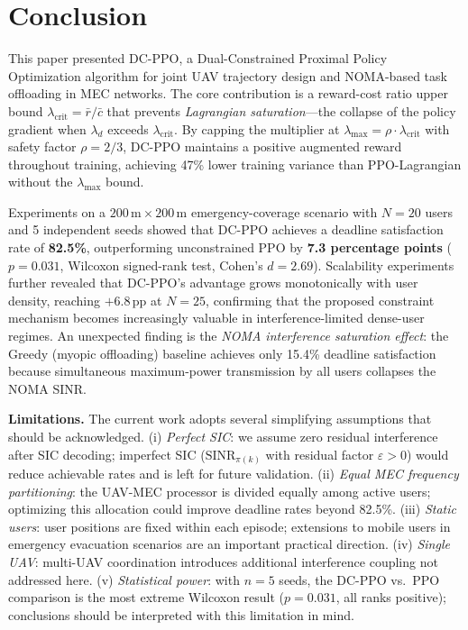 \documentclass[journal]{IEEEtran}
\newcommand{\ld}{\lambda_d}
\begin{document}
\section{Conclusion}\label{sec:conclusion}

This paper presented DC-PPO, a Dual-Constrained Proximal Policy
Optimization algorithm for joint UAV trajectory design and
NOMA-based task offloading in MEC networks.
The core contribution is a reward-cost ratio upper bound
$\lambda_{\text{crit}} = \bar{r}/\bar{c}$ that prevents
\emph{Lagrangian saturation}---the collapse of the policy gradient
when $\ld$ exceeds $\lambda_{\text{crit}}$.
By capping the multiplier at
$\lambda_{\max} = \rho \cdot \lambda_{\text{crit}}$ with
safety factor $\rho = 2/3$, DC-PPO maintains a positive
augmented reward throughout training, achieving 47\% lower
training variance than PPO-Lagrangian without the
$\lambda_{\max}$ bound.

Experiments on a $200\,\text{m} \times 200\,\text{m}$
emergency-coverage scenario with $N{=}20$ users and 5
independent seeds showed that DC-PPO achieves a deadline
satisfaction rate of \textbf{82.5\%}, outperforming
unconstrained PPO by \textbf{7.3 percentage points}
($p{=}0.031$, Wilcoxon signed-rank test, Cohen's $d{=}2.69$).
Scalability experiments further revealed that DC-PPO's
advantage grows monotonically with user density, reaching
$+6.8$\,pp at $N{=}25$, confirming that the proposed
constraint mechanism becomes increasingly valuable in
interference-limited dense-user regimes.
An unexpected finding is the \emph{NOMA interference
saturation effect}: the Greedy (myopic offloading) baseline
achieves only 15.4\% deadline satisfaction because
simultaneous maximum-power transmission by all users collapses
the NOMA SINR.

\textbf{Limitations.}
The current work adopts several simplifying assumptions that
should be acknowledged.
(i) \emph{Perfect SIC}: we assume zero residual interference
after SIC decoding; imperfect SIC
($\text{SINR}_{\pi(k)}$ with residual factor $\varepsilon > 0$)
would reduce achievable rates and is left for future validation.
(ii) \emph{Equal MEC frequency partitioning}: the UAV-MEC
processor is divided equally among active users; optimizing
this allocation could improve deadline rates beyond 82.5\%.
(iii) \emph{Static users}: user positions are fixed within each
episode; extensions to mobile users in emergency evacuation
scenarios are an important practical direction.
(iv) \emph{Single UAV}: multi-UAV coordination introduces
additional interference coupling not addressed here.
(v) \emph{Statistical power}: with $n{=}5$ seeds, the
DC-PPO vs.\ PPO comparison is the most extreme Wilcoxon result
($p{=}0.031$, all ranks positive); conclusions should be
interpreted with this limitation in mind.
\end{document}
